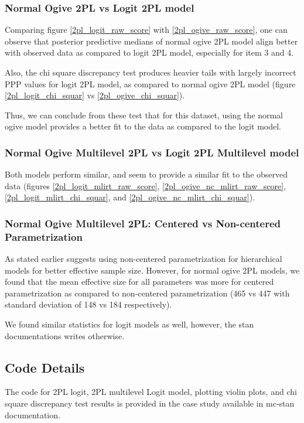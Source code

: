 \documentclass[12pt]{article}
\begin{document}
\subsubsection{Normal Ogive 2PL vs Logit 2PL model}
Comparing figure \ref{2pl_logit_raw_score} with \ref{2pl_ogive_raw_score}, one can observe that posterior predictive medians of normal ogive 2PL model align better with observed data as compared to logit 2PL model, especially for item 3 and 4.

Also, the chi square discrepancy test produces heavier tails with largely incorrect PPP values for logit 2PL model, as compared to normal ogive 2PL model (figure \ref{2pl_logit_chi_squar} vs \ref{2pl_ogive_chi_squar}).

Thus, we can conclude from these test that for this dataset, using the normal ogive model provides a better fit to the data as compared to the logit model.

\subsubsection{Normal Ogive Multilevel 2PL vs Logit 2PL Multilevel model}
Both models perform similar, and seem to provide a similar fit to the observed data (figures \ref{2pl_logit_mlirt_raw_score}, \ref{2pl_ogive_nc_mlirt_raw_score}, \ref{2pl_logit_mlirt_chi_squar}, and \ref{2pl_ogive_nc_mlirt_chi_squar}).

\subsubsection{Normal Ogive Multilevel 2PL: Centered vs Non-centered Parametrization}

As stated earlier \cite{furr2016two} suggests using non-centered parametrization for hierarchical models for better effective sample size. However, for normal ogive 2PL models, we found that the mean effective size for all parameters was more for centered parametrization as compared to non-centered parametrization (465 vs 447 with standard deviation of 148 vs 184 respectively).

We found similar statistics for logit models as well, however, the stan documentations \cite{furr2016two} writes otherwise.

\subsection{Code Details}

The code for 2PL logit, 2PL multilevel Logit model, plotting violin plots, and chi square discrepancy test results is provided in the case study \cite{furr2016two} available in mc-stan documentation.
\end{document}
